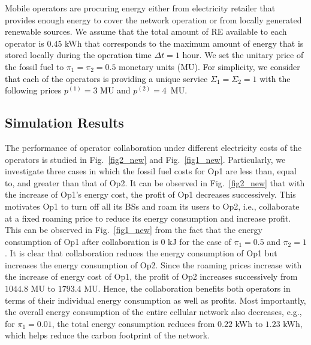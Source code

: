 \documentclass[10pt, letter, twocolumn]{IEEEtran}
\begin{document}
Mobile operators are procuring energy either from electricity retailer that provides enough energy to cover the network operation or from locally generated renewable sources. We assume that the total amount of RE available to each operator is $0.45$ kWh that corresponds to the maximum amount of energy that is stored locally during \textcolor{black}{the operation time $\Delta t=1$ hour}. We set the unitary price of the fossil fuel to $\pi_{1}=\pi_{2}=0.5$ monetary units (MU). \textcolor{black}{For simplicity, we consider that each of the operators is providing a unique service $\Sigma_1=\Sigma_2=1$ with the following prices $p^{(1)}= 3$ MU and $p^{(2)} = 4$~MU.}

\subsection{Simulation Results}
The performance of operator collaboration under different electricity costs of the operators is studied in Fig.~\ref{fig2_new} and Fig.~\ref{fig1_new}. Particularly, we investigate three cases in which the fossil fuel costs for Op1 are less than, equal to, and greater than that of Op2. It can be observed in Fig.~\ref{fig2_new} that with the increase of Op1's energy cost, the profit of Op1 decreases successively. This motivates Op1 to turn off all its BSs and roam its users to Op2, i.e., collaborate at a fixed roaming price to reduce its energy consumption and increase profit. This can be observed in Fig.~\ref{fig1_new} from the fact that the energy consumption of Op1 after collaboration is $0$ kJ for the case of $\pi_{1} = 0.5$ and $\pi_{2} = 1$. It is clear that collaboration reduces the energy consumption of Op1 but increases the energy consumption of Op2. Since the roaming prices increase with the increase of energy cost of Op1, the profit of Op2 increases successively from $1044.8$ MU to $1793.4$ MU. Hence, the collaboration benefits both operators in terms of their individual energy consumption as well as profits. Most importantly, the overall energy consumption of the entire cellular network also decreases, e.g., for $\pi_{1} = 0.01$, the total energy consumption reduces from $0.22$ kWh to $1.23$ kWh, which helps reduce the carbon footprint of the network.
\end{document}
